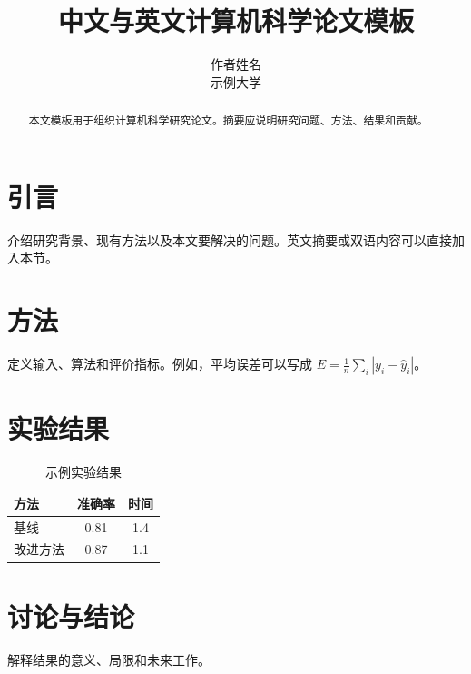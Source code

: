 \documentclass[11pt]{article}
\title{中文与英文计算机科学论文模板}
\author{作者姓名\\示例大学}
\date{}
\begin{document}
\maketitle
\begin{abstract}本文模板用于组织计算机科学研究论文。摘要应说明研究问题、方法、结果和贡献。\end{abstract}
\section{引言}介绍研究背景、现有方法以及本文要解决的问题。英文摘要或双语内容可以直接加入本节。\section{方法}定义输入、算法和评价指标。例如，平均误差可以写成 $E=\frac{1}{n}\sum_i|y_i-\hat y_i|$。
\section{实验结果}\begin{table}[ht]\centering\caption{示例实验结果}\begin{tabular}{lcc}\toprule 方法 & 准确率 & 时间\\\midrule 基线 & 0.81 & 1.4\\ 改进方法 & 0.87 & 1.1\\\bottomrule\end{tabular}\end{table}
\section{讨论与结论}解释结果的意义、局限和未来工作。
\end{document}
